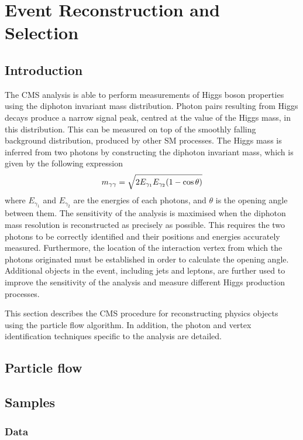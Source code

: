 \chapter{Event Reconstruction and Selection}
\label{chap:objects}

\section{Introduction}

The CMS \Hgg analysis is able to perform measurements of Higgs boson properties using the diphoton invariant mass distribution.
Photon pairs resulting from Higgs decays produce a narrow signal peak, centred at the value of the Higgs mass, in this distribution.
This can be measured on top of the smoothly falling background distribution, produced by other SM processes.
The Higgs mass is inferred from two photons by constructing the diphoton invariant mass, which is given by the following expression
\begin{equation}
m_{\gamma\gamma} = \sqrt{ 2 E_{\gamma_1} E_{\gamma_2} (1 - \cos{\theta}) }
\end{equation}
where $E_{\gamma_1}$ and $E_{\gamma_2}$ are the energies of each photons, and $\theta$ is the opening angle between them.
The sensitivity of the analysis is maximised when the diphoton mass resolution is reconstructed as precisely as possible.
This requires the two photons to be correctly identified and their positions and energies accurately measured.
Furthermore, the location of the interaction vertex from which the photons originated must be established in order to calculate the opening angle.
Additional objects in the event, including jets and leptons, are further used to improve the sensitivity of the analysis and measure different Higgs production processes.

This section describes the CMS procedure for reconstructing physics objects using the particle flow algorithm.
In addition, the photon and vertex identification techniques specific to the \Hgg analysis are detailed.

\section{Particle flow}

\section{Samples}
\subsection{Data}
